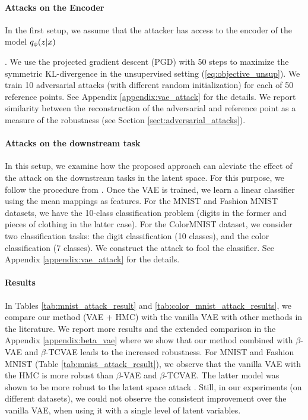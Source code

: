 \paragraph{Attacks on the Encoder} 
In the first setup, we assume that the attacker has access to the encoder of the model ${q_{\phi}(z|x)}$ {\cite{barrett2021certifiably, Gondim-Ribeiro2018-cu, Willetts2019-mu}. We use the projected gradient descent (PGD) with 50 steps to maximize the symmetric KL-divergence in the unsupervised setting (\eqref{eq:objective_unsup}). We train 10 adversarial attacks (with different random initialization) for each of 50 reference points. See Appendix \ref{appendix:vae_attack} for the details. We report similarity between the reconstruction of the adversarial and reference point as a measure of the robustness (see Section \ref{sect:adversarial_attacks}). 

\paragraph{Attacks on the downstream task} 
In this setup, we examine how the proposed approach can aleviate the effect of the attack on the downstream tasks in the latent space. For this purpose, we follow the procedure from \cite{cemgil2020autoencoding, Cemgil2019-vn}. Once the VAE is trained, we learn a linear classifier using the mean mappings as features. For the MNIST and Fashion MNIST datasets, we have the 10-class classification problem (digits in the former and pieces of clothing in the latter case). For the ColorMNIST dataset, we consider two classification tasks: the digit classification (10 classes), and the color classification (7 classes). We construct the attack to fool the classifier. See Appendix \ref{appendix:vae_attack} for the details.


\paragraph{Results} 
In Tables \ref{tab:mnist_attack_result} and \ref{tab:color_mnist_attack_results}, we compare our method (VAE + HMC) with the vanilla VAE with other methods in the literature. We report more results and the extended comparison in the Appendix \ref{appendix:beta_vae} where we show that our method combined with $\beta$-VAE and $\beta$-TCVAE leads to the increased robustness. For MNIST and Fashion MNIST (Table \ref{tab:mnist_attack_result}), we observe that the vanilla VAE with the HMC is more robust than $\beta$-VAE and $\beta$-TCVAE. The latter model was shown to be more robust to the latent space attack \cite{Willetts2019-mu}. Still, in our experiments (on different datasets), we could not observe the consistent improvement over the vanilla VAE, when using it with a single level of latent variables. 

}
